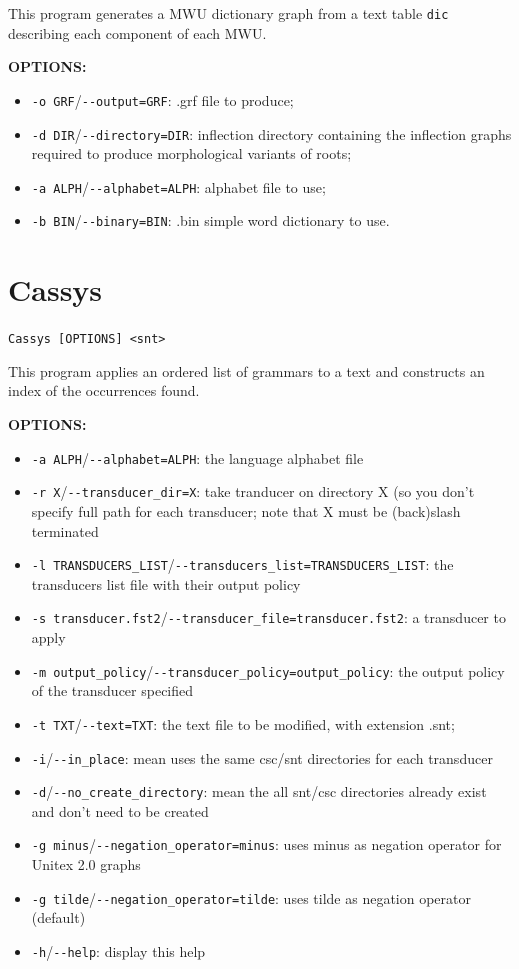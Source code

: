 \bigskip
\noindent This program generates a MWU dictionary graph from a text table \verb+dic+ describing each component
of each MWU.  

\bigskip
\noindent \textbf{OPTIONS:}
\begin{itemize}
   \item \verb+-o GRF+/\verb+--output=GRF+: .grf file to produce;
   \item \verb+-d DIR+/\verb+--directory=DIR+: inflection directory containing the inflection graphs required
   to produce morphological variants of roots;
   \item \verb+-a ALPH+/\verb+--alphabet=ALPH+: alphabet file to use;
   \item \verb+-b BIN+/\verb+--binary=BIN+: .bin simple word dictionary to use.
\end{itemize}

\section{Cassys}
\verb+Cassys [OPTIONS] <snt>+

\bigskip
\noindent This program applies an ordered list of grammars to a text and constructs an index of the occurrences found.

\bigskip
\noindent \textbf{OPTIONS:}
\begin{itemize}
  \item \verb+-a ALPH+/\verb+--alphabet=ALPH+: the language alphabet file
  \item \verb+-r X+/\verb+--transducer_dir=X+: take tranducer on directory X (so you don't specify full path for each transducer; note that X must be (back)slash terminated
	\item \verb+-l TRANSDUCERS_LIST+/\verb+--transducers_list=TRANSDUCERS_LIST+: the transducers list file with their output policy
	\item \verb+-s transducer.fst2+/\verb+--transducer_file=transducer.fst2+: a transducer to apply
	\item \verb+-m output_policy+/\verb+--transducer_policy=output_policy+: the output policy of the transducer specified
  \item \verb+-t TXT+/\verb+--text=TXT+: the text file to be modified, with extension .snt;
	\item \verb+-i+/\verb+--in_place+: mean uses the same csc/snt directories for each transducer
	\item \verb+-d+/\verb+--no_create_directory+: mean the all snt/csc directories already exist and don't need to be created
	\item \verb+-g minus+/\verb+--negation_operator=minus+: uses minus as negation operator for Unitex 2.0 graphs
	\item \verb+-g tilde+/\verb+--negation_operator=tilde+: uses tilde as negation operator (default)
	\item \verb+-h+/\verb+--help+: display this help
\end{itemize} 	

